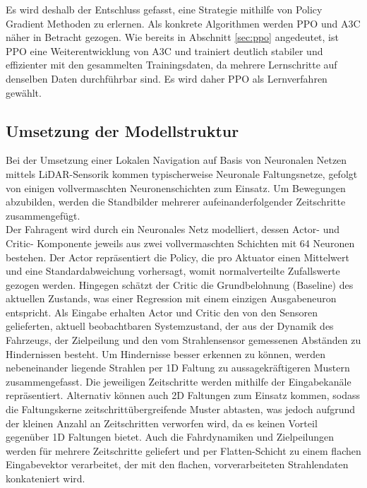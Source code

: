 Es wird deshalb der Entschluss gefasst, eine Strategie mithilfe von Policy Gradient
Methoden zu erlernen. Als konkrete Algorithmen werden PPO und A3C näher in Betracht gezogen.
Wie bereits in Abschnitt \ref{sec:ppo} angedeutet, ist PPO eine Weiterentwicklung von A3C
und trainiert deutlich stabiler und effizienter mit den gesammelten Trainingsdaten,
da mehrere Lernschritte auf denselben Daten durchführbar sind. Es wird daher PPO
als Lernverfahren gewählt.

\subsection{Umsetzung der Modellstruktur}
Bei der Umsetzung einer Lokalen Navigation auf Basis von Neuronalen Netzen mittels
LiDAR-Sensorik kommen typischerweise Neuronale Faltungsnetze, gefolgt von einigen
vollvermaschten Neuronenschichten zum Einsatz. Um Bewegungen abzubilden, werden die
Standbilder mehrerer aufeinanderfolgender Zeitschritte zusammengefügt.\\

Der Fahragent wird durch ein Neuronales Netz modelliert, dessen Actor- und Critic-
Komponente jeweils aus zwei vollvermaschten Schichten mit 64 Neuronen bestehen.
Der Actor repräsentiert die Policy, die pro Aktuator einen Mittelwert und eine
Standardabweichung vorhersagt, womit normalverteilte Zufallswerte gezogen werden.
Hingegen schätzt der Critic die Grundbelohnung (Baseline) des aktuellen Zustands,
was einer Regression mit einem einzigen Ausgabeneuron entspricht.
Als Eingabe erhalten Actor und Critic den von den Sensoren gelieferten, aktuell
beobachtbaren Systemzustand, der aus der Dynamik des Fahrzeugs, der Zielpeilung
und den vom Strahlensensor gemessenen Abständen zu Hindernissen besteht. Um Hindernisse
besser erkennen zu können, werden nebeneinander liegende Strahlen per 1D Faltung
zu aussagekräftigeren Mustern zusammengefasst. Die jeweiligen
Zeitschritte werden mithilfe der Eingabekanäle repräsentiert.
Alternativ können auch 2D Faltungen zum Einsatz kommen, sodass die Faltungskerne
zeitschrittübergreifende Muster abtasten, was jedoch aufgrund der kleinen Anzahl
an Zeitschritten verworfen wird, da es keinen Vorteil gegenüber 1D Faltungen bietet.
Auch die Fahrdynamiken und Zielpeilungen werden für mehrere Zeitschritte geliefert
und per Flatten-Schicht zu einem flachen Eingabevektor verarbeitet, der mit den flachen,
vorverarbeiteten Strahlendaten konkateniert wird.\\

